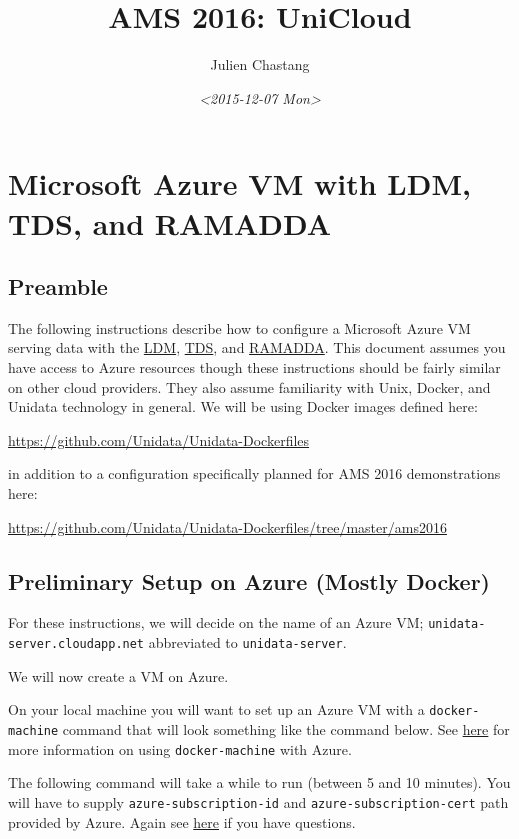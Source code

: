 \documentclass[11pt]{article}
\author{Julien Chastang}
\date{\textit{<2015-12-07 Mon>}}
\title{AMS 2016: UniCloud}
\begin{document}
\maketitle
\tableofcontents

\section*{Microsoft Azure VM with LDM, TDS, and RAMADDA}
\label{sec:orgheadline17}

\subsection*{Preamble}
\label{sec:orgheadline1}

The following instructions describe how to configure a Microsoft Azure VM serving data with the \href{http://www.unidata.ucar.edu/software/ldm/}{LDM}, \href{http://www.unidata.ucar.edu/software/thredds/current/tds/}{TDS}, and \href{http://sourceforge.net/projects/ramadda/}{RAMADDA}. This document assumes you have access to Azure resources though these instructions should be fairly similar on other cloud providers. They also assume familiarity with Unix, Docker, and Unidata technology in general. We will be using Docker images defined here:

\url{https://github.com/Unidata/Unidata-Dockerfiles}

in addition to a configuration specifically planned for AMS 2016 demonstrations here:

\url{https://github.com/Unidata/Unidata-Dockerfiles/tree/master/ams2016}

\subsection*{Preliminary Setup on Azure (Mostly Docker)}
\label{sec:orgheadline2}

For these instructions, we will decide on the name of an Azure VM; \texttt{unidata-server.cloudapp.net} abbreviated to \texttt{unidata-server}.

We will now create a VM on Azure.

On your local machine you will want to set up an Azure VM with a \texttt{docker-machine} command that will look something like the command below. See \href{https://azure.microsoft.com/en-us/documentation/articles/virtual-machines-docker-machine/}{here} for more information on using \texttt{docker-machine} with Azure.

The following command will take a while to run (between 5 and 10 minutes). You will have to supply \texttt{azure-subscription-id} and \texttt{azure-subscription-cert} path provided by Azure. Again see \href{https://azure.microsoft.com/en-us/documentation/articles/virtual-machines-docker-machine/}{here} if you have questions.
\end{document}

